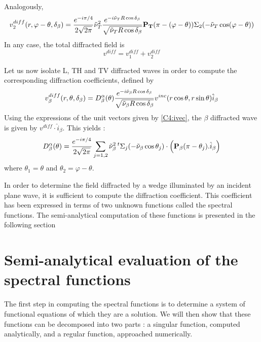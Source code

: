 Analogously,
\begin{equation}
v_2^{diff}(r,\varphi-\theta,\delta_{\beta})=\frac{e^{-i\pi/4}}{2\sqrt{2\pi}}\tilde{\nu}_T^2\frac{e^{-i\tilde{\nu}_TR\cos\delta_{\beta}}}{\sqrt{\tilde{\nu}_TR\cos\delta_{\beta}}}\mathbf{P_T}(\pi-(\varphi-\theta))\Sigma_2(-\tilde{\nu}_T\cos(\varphi-\theta))
\end{equation}
In any case, the total diffracted field is
\begin{equation}
v^{diff}=v_1^{diff}+v_2^{diff}
\end{equation}

Let us now isolate L, TH and TV diffracted waves in order to compute the corresponding diffraction coefficients, defined by
\begin{equation}
v_{\beta}^{diff}(r,\theta,\delta_{\beta})=D_{\beta}^{\alpha}(\theta)\frac{e^{-i\tilde{\nu}_{\beta}R\cos\delta_{\beta}}}{\sqrt{\tilde{\nu}_{\beta}R\cos\delta_{\beta}}} v^{inc}(r\cos\theta,r\sin\theta) \hat{i}_{\beta}
\label{C4:coeffdiff}
\end{equation}
Using the expressions of the unit vectors given by \eqref{C4:ivec}, the $\beta$ diffracted wave is given by $v^{diff}\cdot \hat{i}_{\beta}$. This yields :
\begin{equation}
D_{\beta}^{\alpha}(\theta)=\frac{e^{-i\pi/4}}{2\sqrt{2\pi}}\sum_{j=1,2}\tilde{\nu}_{\beta}^2 \,{}^t \Sigma_j(-\tilde{\nu}_{\beta}\cos\theta_j)\cdot\left(\mathbf{P}_{\beta}(\pi-\theta_j).\hat{i}_{\beta}\right)
\label{C4:Dbeta}
\end{equation}
where $\theta_1=\theta$ and $\theta_2=\varphi-\theta$.

In order to determine the field diffracted by a wedge illuminated by an incident plane wave, it is sufficient to compute the diffraction coefficient. This coefficient has been expressed in terms of two unknown functions called the spectral functions. The semi-analytical computation of these functions is presented in the following section

\section{Semi-analytical evaluation of the spectral functions}
The first step in computing the spectral functions is to determine a system of functional equations of which they are a solution. We will then show that these functions can be decomposed into two parts : a singular function, computed analytically, and a regular function, approached numerically.
